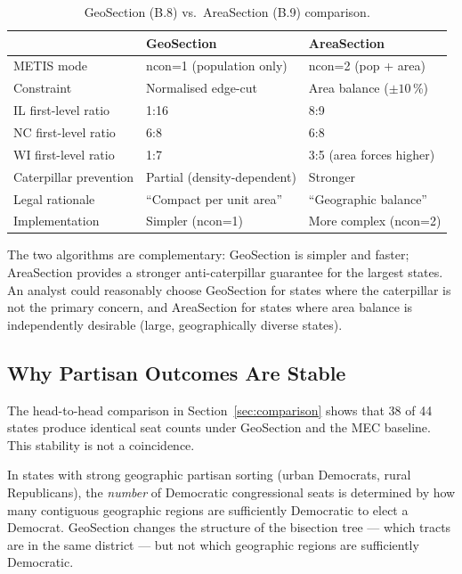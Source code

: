 \begin{table}[h]
\centering
\caption{GeoSection (B.8) vs.\ AreaSection (B.9) comparison.}
\label{tab:geosection-vs-areasection}
\begin{tabular}{lll}
\toprule
& GeoSection & AreaSection \\
\midrule
METIS mode & ncon=1 (population only) & ncon=2 (pop + area) \\
Constraint & Normalised edge-cut & Area balance ($\pm 10$\,\%) \\
IL first-level ratio & 1:16 & 8:9 \\
NC first-level ratio & 6:8 & 6:8 \\
WI first-level ratio & 1:7 & 3:5 (area forces higher) \\
Caterpillar prevention & Partial (density-dependent) & Stronger \\
Legal rationale & ``Compact per unit area'' & ``Geographic balance'' \\
Implementation & Simpler (ncon=1) & More complex (ncon=2) \\
\bottomrule
\end{tabular}
\end{table}

The two algorithms are complementary: GeoSection is simpler and faster;
AreaSection provides a stronger anti-caterpillar guarantee for the largest
states.
An analyst could reasonably choose GeoSection for states where the caterpillar
is not the primary concern, and AreaSection for states where area balance
is independently desirable (large, geographically diverse states).

\subsection{Why Partisan Outcomes Are Stable}
\label{sec:stability}

The head-to-head comparison in Section~\ref{sec:comparison} shows that
38 of 44 states produce identical seat counts under GeoSection and the
MEC baseline.
This stability is not a coincidence.

In states with strong geographic partisan sorting (urban Democrats, rural
Republicans), the \emph{number} of Democratic congressional seats is
determined by how many contiguous geographic regions are sufficiently
Democratic to elect a Democrat.
GeoSection changes the structure of the bisection tree --- which tracts
are in the same district --- but not which geographic regions are
sufficiently Democratic.

